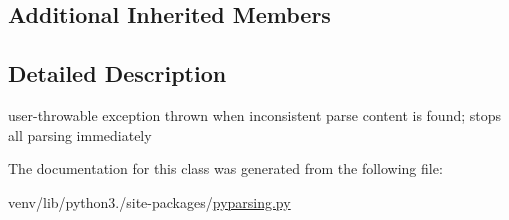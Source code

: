 \subsection*{Additional Inherited Members}


\subsection{Detailed Description}
\begin{DoxyVerb}user-throwable exception thrown when inconsistent parse content
   is found; stops all parsing immediately\end{DoxyVerb}
 

The documentation for this class was generated from the following file\+:\begin{DoxyCompactItemize}
\item 
venv/lib/python3./site-\/packages/\hyperlink{pyparsing_8py}{pyparsing.\+py}\end{DoxyCompactItemize}
